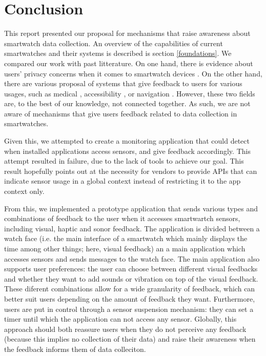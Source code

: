\documentclass[conference, a4paper, 10pt, twocolumn]{IEEEtran}
\begin{document}
\section{Conclusion}
This report presented our proposal for mechanisms that raise awareness about smartwatch data collection. An overview of the capabilities of current smartwatches and their systems is described is section \ref{foundations}. We compared our work with past litterature. On one hand, there is evidence about users' privacy concerns when it comes to smartwatch devices \cite{udoh2016privacy,datta2018survey,motti2015users}. On the other hand, there are various proposal of systems that give feedback to users for various usages, such as medical \cite{lee2019smartwatch}, accessibility \cite{goodman2020evaluating}, or navigation \cite{dobbelstein2016unconstrained}. However, these two fields are, to the best of our knowledge, not connected together. As such, we are not aware of mechanisms that give users feedback related to data collection in smartwatches. 

Given this, we attempted to create a monitoring application that could detect when installed applications access sensors, and give feedback accordingly. This attempt resulted in failure, due to the lack of tools to achieve our goal. This result hopefully points out at the necessity for vendors to provide \acp{API} that can indicate sensor usage in a global context instead of restricting it to the app context only. 

From this, we implemented a prototype application that sends various types and combinations of feedback to the user when it accesses smartwartch sensors, including visual, haptic and sonor feedback. The application is divided between a watch face (i.e. the main interface of a smartwatch which mainly displays the time among other things; here, visual feedback) an a main application which accesses sensors and sends messages to the watch face. The main application also supports user preferences: the user can choose between different visual feedbacks and whether they want to add sounds or vibration on top of the visual feedback. These diferent combinations allow for a wide granularity of feedback, which can better suit users depending on the amount of feedback they want. Furthermore, users are put in control through a sensor suspension mechanism: they can set a timer until which the application can not access any sensor. Globally, this approach should both reassure users when they do not perceive any feedback (because this implies no collection of their data) and raise their awareness when the feedback informs them of data colleciton.  
\end{document}
